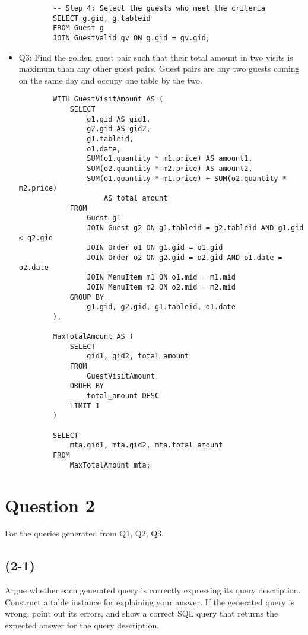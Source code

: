 \documentclass{article}
\begin{document}
\begin{itemize}
\begin{verbatim}
        -- Step 4: Select the guests who meet the criteria
        SELECT g.gid, g.tableid
        FROM Guest g
        JOIN GuestValid gv ON g.gid = gv.gid;
    \end{verbatim}
    \item Q3: Find the golden guest pair such that their total amount in two visits is maximum
    than any other guest pairs. Guest pairs are any two guests coming on the same day
    and occupy one table by the two.
    \begin{verbatim}
        WITH GuestVisitAmount AS (
            SELECT
                g1.gid AS gid1,
                g2.gid AS gid2,
                g1.tableid,
                o1.date,
                SUM(o1.quantity * m1.price) AS amount1,
                SUM(o2.quantity * m2.price) AS amount2,
                SUM(o1.quantity * m1.price) + SUM(o2.quantity * m2.price) 
                    AS total_amount
            FROM
                Guest g1
                JOIN Guest g2 ON g1.tableid = g2.tableid AND g1.gid < g2.gid
                JOIN Order o1 ON g1.gid = o1.gid
                JOIN Order o2 ON g2.gid = o2.gid AND o1.date = o2.date
                JOIN MenuItem m1 ON o1.mid = m1.mid
                JOIN MenuItem m2 ON o2.mid = m2.mid
            GROUP BY
                g1.gid, g2.gid, g1.tableid, o1.date
        ),

        MaxTotalAmount AS (
            SELECT
                gid1, gid2, total_amount
            FROM
                GuestVisitAmount
            ORDER BY
                total_amount DESC
            LIMIT 1
        )

        SELECT
            mta.gid1, mta.gid2, mta.total_amount
        FROM
            MaxTotalAmount mta;
    \end{verbatim}
\end{itemize}

\section*{Question 2}
For the queries generated from Q1, Q2, Q3.
\subsection*{(2-1)}
Argue whether each generated query is correctly expressing its query
description. Construct a table instance for explaining your answer. If the
generated query is wrong, point out its errors, and show a correct SQL query
that returns the expected answer for the query description.
\end{document}
